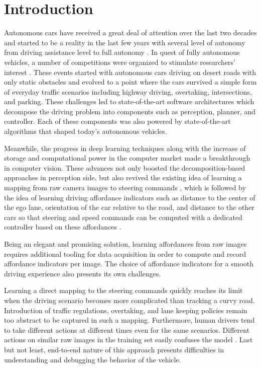 \chapter{Introduction}
\label{chp:b1}

Autonomous cars have received a great deal of attention over the last two
decades and started to be a reality in the last few years with several level of
autonomy from driving assistance level to full autonomy
\cite{Holstein2018EthicalAS}. In quest of fully autonomous vehicles, a number
of competitions were organized to stimulate researchers' interest
\cite{Buehler2007The2D, Buehler2009TheDU}. These events started with autonomous
cars driving on desert roads with only static obstacles and evolved to a point
where the cars survived a simple form of everyday traffic scenarios including
highway driving, overtaking, intersections, and parking. These challenges led
to state-of-the-art software architectures which decompose the driving problem
into components such as perception, planner, and controller. Each of these
components was also powered by state-of-the-art algorithms that shaped today's
autonomous vehicles.

Meanwhile, the progress in deep learning techniques along with the increase of
storage and computational power in the computer market made a breakthrough in
computer vision. These advances not only boosted the decomposition-based
approaches in perception side, but also revived the existing idea of learning a
mapping from raw camera images to steering commands \cite{Bojarski2016EndTE},
which is followed by the idea of learning driving affordance indicators such as
distance to the center of the ego lane, orientation of the car relative to the
road, and distance to the other cars so that steering and speed commands can be
computed with a dedicated controller based on these affordances
\cite{Chen2015DeepDrivingLA}.

Being an elegant and promising solution, learning affordances from raw
images requires additional tooling for data acquisition in order to compute and
record affordance indicators per image. The choice of affordance indicators for
a smooth driving experience also presents its own challenges.

Learning a direct mapping to the steering commands quickly reaches its limit
when the driving scenario becomes more complicated than tracking a curvy
road. Introduction of traffic regulations, overtaking, and lane keeping
policies remain too abstract to be captured in such a mapping. Furthermore,
human drivers tend to take different actions at different times even for the
same scenarios. Different actions on similar raw images in the training set
easily confuses the model \cite{Chen2015DeepDrivingLA}. Last but not least,
end-to-end nature of this approach presents difficulties in understanding and
debugging the behavior of the vehicle.

